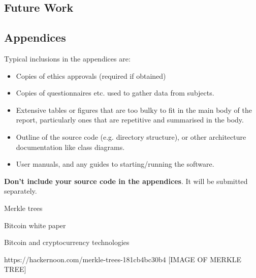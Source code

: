\documentclass{l4proj}
\begin{document}
\section{Future Work}

%
% 

\begin{appendices}

\chapter{Appendices}

Typical inclusions in the appendices are:

\begin{itemize}
\item
  Copies of ethics approvals (required if obtained)
\item
  Copies of questionnaires etc. used to gather data from subjects.
\item
  Extensive tables or figures that are too bulky to fit in the main body of
  the report, particularly ones that are repetitive and summarised in the body.

\item Outline of the source code (e.g. directory structure), or other architecture documentation like class diagrams.

\item User manuals, and any guides to starting/running the software.

\end{itemize}

\textbf{Don't include your source code in the appendices}. It will be
submitted separately.

\end{appendices}






Merkle trees

Bitcoin white paper

Bitcoin and cryptocurrency technologies

https://hackernoon.com/merkle-trees-181cb4bc30b4
[IMAGE OF MERKLE TREE] 
\end{document}
